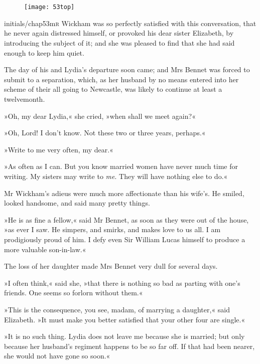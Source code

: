 \chapter[Chapter \thechapter]{}
	
	
\begin{figure}[t!]
\centering
\texttt{[image: 53top]}
\end{figure}


\lettrine[lines=6,image=true]{initials/chap53m}{r}  Wickham was so perfectly satisfied with this conversation, that he never again distressed himself, or provoked his dear sister Elizabeth, by introducing the subject of it; and she was pleased to find that she had said enough to keep him quiet.

\zz
The day of his and Lydia's departure soon came; and Mrs Bennet was forced to submit to a separation, which, as her husband by no means entered into her scheme of their all going to Newcastle, was likely to continue at least a twelvemonth.

»Oh, my dear Lydia,« she cried, »when shall we meet again?«

»Oh, Lord! I don't know. Not these two or three years, perhaps.«

»Write to me very often, my dear.«

»As often as I can. But you know married women have never much time for writing. My sisters may write to \textit{me}. They will have nothing else to do.«

Mr Wickham's adieus were much more affectionate than his wife's. He smiled, looked handsome, and said many pretty things.

»He is as fine a fellow,« said Mr Bennet, as soon as they were out of the house, »as ever I saw. He simpers, and smirks, and makes love to us all. I am prodigiously proud of him. I defy even Sir William Lucas himself to produce a more valuable son-in-law.«

The loss of her daughter made Mrs Bennet very dull for several days.

»I often think,« said she, »that there is nothing so bad as parting with one's friends. One seems so forlorn without them.«

»This is the consequence, you see, madam, of marrying a daughter,« said Elizabeth. »It must make you better satisfied that your other four are single.«

»It is no such thing. Lydia does not leave me because she is married; but only because her husband's regiment happens to be so far off. If that had been nearer, she would not have gone so soon.«

